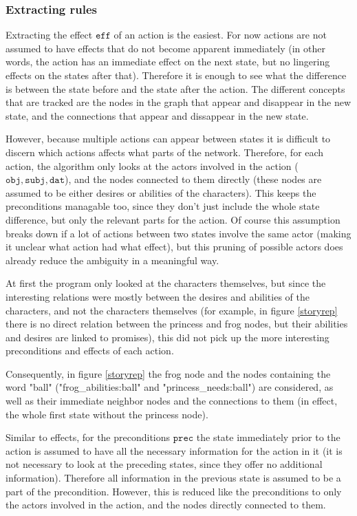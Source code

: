 \subsubsection{Extracting rules}

Extracting the effect $\texttt{eff}$ of an action is the easiest. For now
actions are not assumed to have effects that do not become apparent immediately
(in other words, the action has an immediate effect on the next state, but no
lingering effects on the states after that).
Therefore it is enough to see what the difference is between the state before
and the state after the action. The different concepts that are tracked are the
nodes in the graph that appear and disappear in the new state, and the
connections that appear and dissappear in the new state.

However, because multiple actions can appear between states it is difficult to
discern which actions affects what parts of the network. 
Therefore, for each action, the algorithm only looks at the actors involved in 
the action ($\texttt{obj}, \texttt{subj}, \texttt{dat}$), and the nodes
connected to them directly (these nodes are assumed to be either desires or
abilities of the characters). This keeps the preconditions managable too, since
they don't just include the whole state difference, but only the relevant parts
for the action. Of course this assumption breaks down if a lot of actions
between two states
involve the same actor (making it unclear what action had what effect), but this pruning of possible actors does already reduce
the ambiguity in a meaningful way.

At first the program only looked at the characters themselves, but since the
interesting relations were mostly between the desires and abilities of the
characters, and not the characters themselves (for example, in figure
\ref{storyrep} there is no direct relation between the princess and frog nodes,
but their abilities and desires are linked to promises), this did not pick up the more
interesting preconditions and effects of each action.

Consequently, in figure \ref{storyrep} the frog node and the nodes containing the word
"ball" ("frog\_abilities:ball" and "princess\_needs:ball") are considered, as
well as their immediate neighbor nodes and the connections to them (in effect,
the whole first state without the princess node).

Similar to effects, for the preconditions $\texttt{prec}$ the state immediately prior to the action
is assumed to have all the
necessary information for the action in it (it is not necessary to look at the 
preceding states, since they offer no additional information). Therefore all
information in the previous state is assumed to be a part of the precondition.
However, this is reduced like the preconditions to only the actors involved in
the action, and the nodes directly connected to them.


